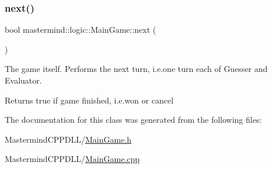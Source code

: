 \subsubsection{\texorpdfstring{next()}{next()}}
{\footnotesize\ttfamily bool mastermind\+::logic\+::\+Main\+Game\+::next (\begin{DoxyParamCaption}{ }\end{DoxyParamCaption})}



The game itself. Performs the next turn, i.\+e.\+one turn each of Guesser and Evaluator. 

\begin{DoxyReturn}{Returns}
{\ttfamily true} if game finished, i.\+e.\+won or cancel 
\end{DoxyReturn}


The documentation for this class was generated from the following files\+:\begin{DoxyCompactItemize}
\item 
Mastermind\+C\+P\+P\+D\+L\+L/\hyperlink{_main_game_8h}{Main\+Game.\+h}\item 
Mastermind\+C\+P\+P\+D\+L\+L/\hyperlink{_main_game_8cpp}{Main\+Game.\+cpp}\end{DoxyCompactItemize}
